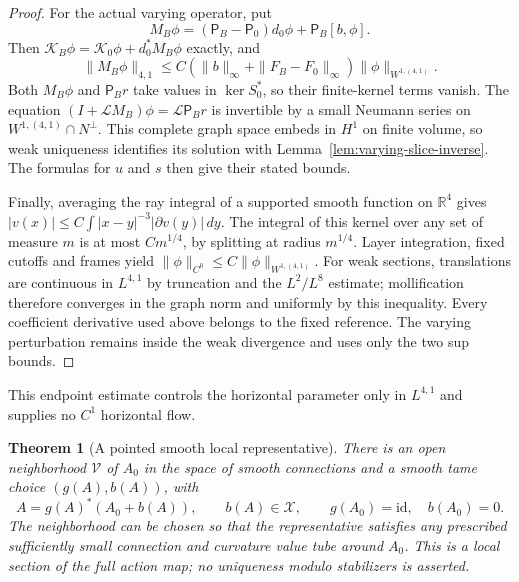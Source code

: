 \documentclass[11pt]{article}
\numberwithin{equation}{section}
\newtheorem{theorem}{Theorem}[section]
\theoremstyle{definition}
\theoremstyle{remark}
\begin{document}
\begin{proof}
For the actual varying operator, put
\[
 M_B\phi=(\mathsf P_B-\mathsf P_0)d_0\phi+
                  \mathsf P_B[b,\phi].
\]
Then
$\mathcal K_B\phi=\mathcal K_0\phi+d_0^*M_B\phi$ exactly,
and
\[
 \|M_B\phi\|_{4,1}\le
 C(\|b\|_\infty+\|F_B-F_0\|_\infty)
                  \|\phi\|_{W^{1,(4,1)}}.
\]
Both $M_B\phi$ and $\mathsf P_Br$ take values in
$\ker S_0^*$, so their finite-kernel terms vanish.
The equation
$(I+\mathscr LM_B)\phi=\mathscr L\mathsf P_Br$
is invertible by a small Neumann series on
$W^{1,(4,1)}\cap N^\perp$.
This complete graph space embeds in $H^1$ on finite
volume, so weak uniqueness identifies its solution with
Lemma~\ref{lem:varying-slice-inverse}.
The formulas for $u$ and $s$ then give their stated bounds.

Finally, averaging the ray integral of a supported smooth
function on $\mathbb R^4$ gives
$|v(x)|\le C\int|x-y|^{-3}|\partial v(y)|\,dy$.
The integral of this kernel over any set of measure $m$
is at most $Cm^{1/4}$, by splitting at radius $m^{1/4}$.
Layer integration, fixed cutoffs and frames yield
$\|\phi\|_{C^0}\le C\|\phi\|_{W^{1,(4,1)}}$.
For weak sections, translations are continuous in
$L^{4,1}$ by truncation and the $L^2/L^8$ estimate;
mollification therefore converges in the graph norm
and uniformly by this inequality.
Every coefficient derivative used above belongs to the
fixed reference. The varying perturbation remains inside
the weak divergence and uses only the two sup bounds.
\end{proof}

This endpoint estimate controls the horizontal parameter
only in $L^{4,1}$ and supplies no $C^1$ horizontal flow.

\begin{theorem}[A pointed smooth local representative]
\label{thm:smooth-local-slice}
There is an open neighborhood $\mathcal V$ of $A_0$
in the space of smooth connections and a smooth tame
choice $(g(A),b(A))$, with
\[
 A=g(A)^*(A_0+b(A)),\qquad b(A)\in\mathcal X,\qquad
 g(A_0)=\mathrm{id},\quad b(A_0)=0.
\]
The neighborhood can be chosen so that the representative
satisfies any prescribed sufficiently small connection
and curvature value tube around $A_0$.
This is a local section of the full action map;
no uniqueness modulo stabilizers is asserted.
\end{theorem}
\end{document}
